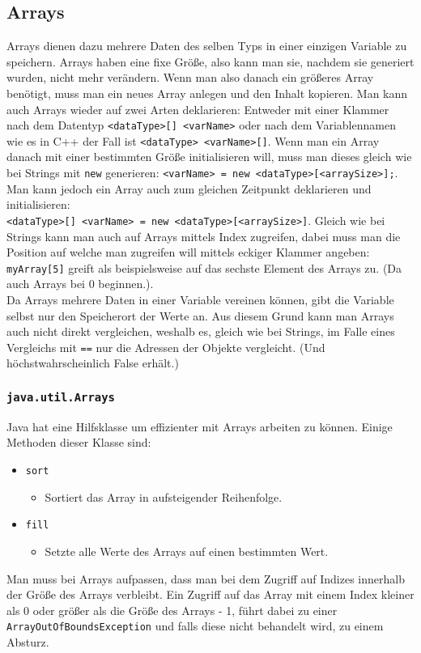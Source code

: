 \documentclass{article}
\begin{document}
	\subsection{Arrays}
	Arrays dienen dazu mehrere Daten des selben Typs in einer einzigen Variable zu speichern. Arrays haben eine fixe Größe, also kann man sie, nachdem sie generiert wurden, nicht mehr verändern. Wenn man also danach ein größeres Array benötigt, muss man ein neues Array anlegen und den Inhalt kopieren. Man kann auch Arrays wieder auf zwei Arten deklarieren: Entweder mit einer Klammer nach dem Datentyp \verb|<dataType>[] <varName>| oder nach dem Variablennamen wie es in C++ der Fall ist \verb|<dataType> <varName>[]|. Wenn man ein Array danach mit einer bestimmten Größe initialisieren will, muss man dieses gleich wie bei Strings mit \verb|new| generieren: \verb|<varName> = new <dataType>[<arraySize>];|.\\
	Man kann jedoch ein Array auch zum gleichen Zeitpunkt deklarieren und initialisieren: \\ \verb|<dataType>[] <varName> = new <dataType>[<arraySize>]|.
	Gleich wie bei Strings kann man auch auf Arrays mittels Index zugreifen, dabei muss man die Position auf welche man zugreifen will mittels eckiger Klammer angeben: \verb|myArray[5]| greift als beispielsweise auf das sechste Element des Arrays zu. (Da auch Arrays bei 0 beginnen.). \\
	Da Arrays mehrere Daten in einer Variable vereinen können, gibt die Variable selbst nur den Speicherort der Werte an. Aus diesem Grund kann man Arrays auch nicht direkt vergleichen, weshalb es, gleich wie bei Strings, im Falle eines Vergleichs mit \verb|==| nur die Adressen der Objekte vergleicht. (Und höchstwahrscheinlich False erhält.) \\
	\cprotect\subsubsection{\verb|java.util.Arrays|}
	Java hat eine Hilfsklasse um effizienter mit Arrays arbeiten zu können. Einige Methoden dieser Klasse sind:
	\begin{itemize}
		\item{\verb|sort|}
		\begin{itemize}
			\item{Sortiert das Array in aufsteigender Reihenfolge.}
		\end{itemize}
		\item{\verb|fill|}
		\begin{itemize}
			\item{Setzte alle Werte des Arrays auf einen bestimmten Wert.}
		\end{itemize}
	\end{itemize}    
	Man muss bei Arrays aufpassen, dass man bei dem Zugriff auf Indizes innerhalb der Größe des Arrays verbleibt. Ein Zugriff auf das Array mit einem Index kleiner als 0 oder größer als die Größe des Arrays - 1, führt dabei zu einer \verb|ArrayOutOfBoundsException| und falls diese nicht behandelt wird, zu einem Absturz.
\end{document}
